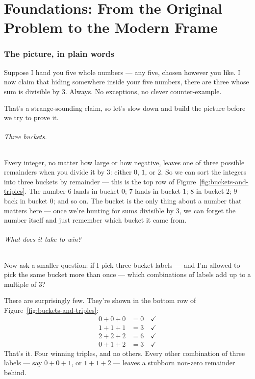 \documentclass[11pt,a4paper]{article}
\theoremstyle{plain}
\theoremstyle{definition}
\theoremstyle{remark}
\begin{document}
\newpage

\part{Foundations: From the Original Problem to the Modern Frame}

\section{The picture, in plain words}
\label{sec:intro}

Suppose I hand you five whole numbers --- any five, chosen however you
like. I now claim that hiding somewhere inside your five numbers, there
are three whose sum is divisible by $3$. Always. No exceptions, no
clever counter-example.

That's a strange-sounding claim, so let's slow down and build the
picture before we try to prove it.

\paragraph{Three buckets.}
Every integer, no matter how large or how negative, leaves one of three
possible remainders when you divide it by $3$: either $0$, $1$, or $2$.
So we can sort the integers into three buckets by remainder --- this is
the top row of Figure~\ref{fig:buckets-and-triples}. The number $6$
lands in bucket $0$; $7$ lands in bucket $1$; $8$ in bucket $2$; $9$
back in bucket $0$; and so on. The bucket is the only thing about a
number that matters here --- once we're hunting for sums divisible by
$3$, we can forget the number itself and just remember which bucket it
came from.

\paragraph{What does it take to win?}
Now ask a smaller question: if I pick three bucket labels --- and I'm
allowed to pick the same bucket more than once --- which combinations
of labels add up to a multiple of $3$?

There are surprisingly few. They're shown in the bottom row of
Figure~\ref{fig:buckets-and-triples}:
\begin{align*}
  0 + 0 + 0 &= 0 \quad\checkmark \\
  1 + 1 + 1 &= 3 \quad\checkmark \\
  2 + 2 + 2 &= 6 \quad\checkmark \\
  0 + 1 + 2 &= 3 \quad\checkmark
\end{align*}
That's it. Four winning triples, and no others. Every other combination
of three labels --- say $0+0+1$, or $1+1+2$ --- leaves a stubborn
non-zero remainder behind.
\end{document}

